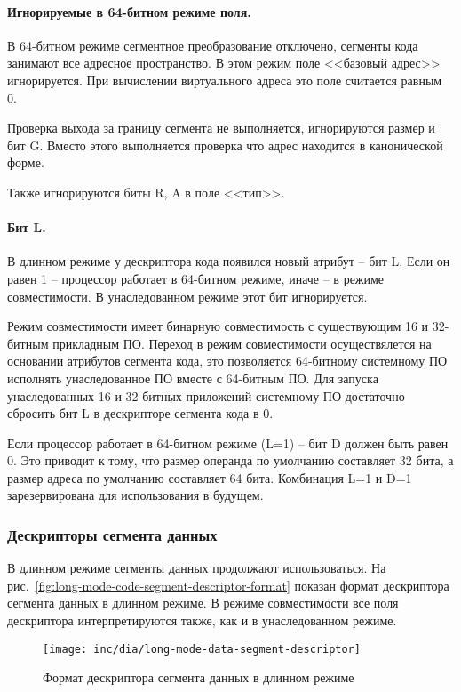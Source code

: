\paragraph{Игнорируемые в 64-битном режиме поля.}
В 64-битном режиме сегментное преобразование отключено, сегменты кода занимают все адресное пространство.
В этом режим поле <<базовый адрес>> игнорируется. При вычислении виртуального адреса это поле считается равным 0.

Проверка выхода за границу сегмента не выполняется, игнорируются размер и бит G. Вместо этого выполняется
проверка что адрес находится в канонической форме.

Также игнорируются биты R, A в поле <<тип>>.

\paragraph{Бит L.} В длинном режиме у дескриптора кода появился новый атрибут -- бит L. Если он равен 1 --
процессор работает в 64-битном режиме, иначе -- в режиме совместимости. В унаследованном режиме этот бит игнорируется.

Режим совместимости имеет бинарную совместимость с существующим 16 и 32-битным прикладным ПО.
Переход в режим совместимости осуществялется на основании атрибутов сегмента кода, это позволяется
64-битному системному ПО исполнять унаследованное ПО вместе с 64-битным ПО. Для запуска унаследованных
16 и 32-битных приложений системному ПО достаточно сбросить бит L в дескрипторе сегмента кода в 0.

Если процессор работает в 64-битном режиме (L=1) -- бит D должен быть равен 0. Это приводит к тому,
что размер операнда по умолчанию составляет 32 бита, а размер адреса по умолчанию составляет 64 бита.
Комбинация L=1 и D=1 зарезервирована для использования в будущем.

\subsubsection*{Дескрипторы сегмента данных}
В длинном режиме сегменты данных продолжают использоваться. На рис.~\ref{fig:long-mode-code-segment-descriptor-format}
показан формат дескриптора сегмента данных в длинном режиме. В режиме совместимости все поля дескриптора
интерпретируются также, как и в унаследованном режиме.

\begin{figure}[ht]
  \centering
  \texttt{[image: inc/dia/long-mode-data-segment-descriptor]}
  \caption{Формат дескриптора сегмента данных в длинном режиме}
  \label{fig:long-mode-data-segment-descriptor-format}
\end{figure}

